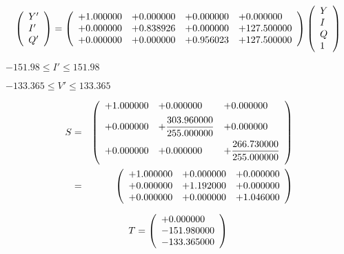 \documentclass{article}
\begin{document}
\[ \left( \begin{array}{l} Y' \\ I' \\ Q' \\ \end{array} \right) = \left( \begin{array}{llll} +1.000000 & +0.000000 & +0.000000 & +0.000000 \\ +0.000000 & +0.838926 & +0.000000 & +127.500000 \\ +0.000000 & +0.000000 & +0.956023 & +127.500000 \\ \end{array} \right) \left( \begin{array}{l} Y \\ I \\ Q \\ 1 \\ \end{array} \right) \\ \]
\pagebreak

$ -151.98 \le I' \le 151.98 $
\pagebreak

$ -133.365 \le V' \le 133.365 $
\pagebreak

\begin{eqnarray*} S &=& \left( \begin{array}{lll} +1.000000 & +0.000000 & +0.000000 \vspace{.5em} \\ +0.000000 & +\dfrac{303.960000}{255.000000} & +0.000000 \vspace{.5em} \\ +0.000000 & +0.000000 & +\dfrac{266.730000}{255.000000} \vspace{.5em} \\ \end{array} \right) \\ &=& \left( \begin{array}{lll} +1.000000 & +0.000000 & +0.000000 \\ +0.000000 & +1.192000 & +0.000000 \\ +0.000000 & +0.000000 & +1.046000 \\ \end{array} \right) \\ \end{eqnarray*}
\pagebreak

\[ T = \left( \begin{array}{l} +0.000000 \\ -151.980000 \\ -133.365000 \\ \end{array} \right) \\ \]
\pagebreak
\end{document}
